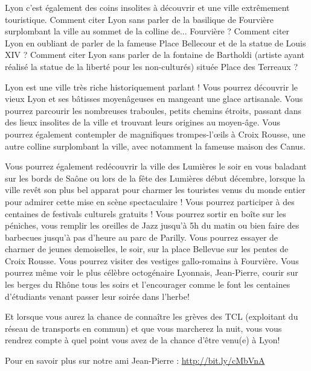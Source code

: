 Lyon c'est également des coins insolites à découvrir et une ville extrêmement
touristique. Comment citer Lyon sans parler de la basilique de Fourvière
surplombant la ville au sommet de la colline de... Fourvière ? Comment citer
Lyon en oubliant de parler de la fameuse Place Bellecour et de la statue de
Louis XIV ? Comment citer Lyon sans parler de la fontaine de Bartholdi (artiste
ayant réalisé la statue de la liberté pour les non-culturés) située
Place des Terreaux ?

Lyon est une ville très riche historiquement parlant ! Vous pourrez découvrir le
vieux Lyon et ses bâtisses moyenâgeuses en mangeant une glace artisanale. Vous
pourrez parcourir les nombreuses traboules, petits chemins étroits, passant dans
des lieux insolites de la ville et trouvant leurs origines au moyen-âge. Vous
pourrez également contempler de magnifiques trompes-l'œils à Croix Rousse, une
autre colline surplombant la ville, avec notamment la fameuse maison des Canus.


Vous pourrez également redécouvrir la ville des Lumières le soir en vous
baladant sur les bords de Saône ou lors de la fête des Lumières début décembre,
lorsque la ville revêt son plus bel apparat pour charmer les touristes
venus du monde entier pour admirer cette mise en scène spectaculaire !
Vous pourrez participer à des centaines de festivals culturels gratuits
! Vous pourrez sortir en boîte sur les péniches, vous remplir les
oreilles de Jazz jusqu'à 5h du matin ou bien faire des barbecues
jusqu'à pas d'heure au parc de Parilly. Vous pourrez essayer de
charmer de jeunes demoiselles, le soir, sur la place Bellevue sur les
pentes de Croix Rousse. Vous pourrez visiter des vestiges gallo-romains
à Fourvière. Vous pourrez même voir le plus célèbre octogénaire
Lyonnais, Jean-Pierre, courir sur les berges du Rhône tous les soirs et
l'encourager comme le font les centaines d'étudiants venant passer leur
soirée dans l'herbe!

Et lorsque vous aurez la chance de connaître les grèves des TCL (exploitant du
réseau de transports en commun) et que vous marcherez la nuit, vous vous
rendrez compte à quel point vous avez de la chance d'être venu(e) à Lyon!

Pour en savoir plus sur notre ami Jean-Pierre :
\url{http://bit.ly/cMbVnA}



